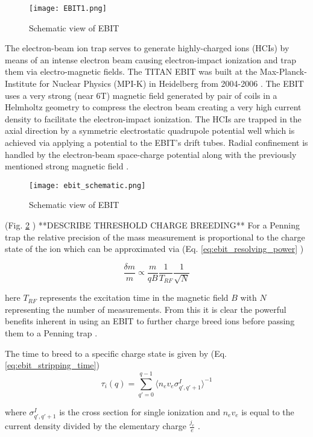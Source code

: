 \documentclass[cnatzke_thesis_proposal.tex]{subfiles}
\begin{document}
\begin{figure}[H]
  \begin{center}
    \texttt{[image: EBIT1.png]}
  \end{center}
  \caption{Schematic view of EBIT}
  \label{fig:EBIT_CUTOUT}
\end{figure}

The electron-beam ion trap serves to generate highly-charged ions (HCIs) by means of an intense electron beam causing electron-impact ionization and trap them via electro-magnetic fields.  The TITAN EBIT was built at the Max-Planck-Institute for Nuclear Physics (MPI-K) in Heidelberg from 2004-2006 \cite{TITAN_EBIT_2010}.  The EBIT uses a very strong (near 6T) magnetic field generated by pair of coils in a Helmholtz geometry to compress the electron beam creating a very high current density to facilitate the electron-impact ionization.  The HCIs are trapped in the axial direction by a symmetric electrostatic quadrupole potential well which is achieved via applying a potential to the EBIT's drift tubes.  Radial confinement is handled by the electron-beam space-charge potential along with the previously mentioned strong magnetic field \cite{TITAN_EBIT_2010}.

\begin{figure}[H]
  \begin{center}
    \texttt{[image: ebit\_schematic.png]}
  \end{center}
  \caption{Schematic view of EBIT \cite{PALFFY_THESIS}}
  \label{fig:schematic_ebit}
\end{figure}

(Fig. \ref{fig:schematic_ebit} )
**DESCRIBE  THRESHOLD CHARGE BREEDING**
For a Penning trap the relative precision of the mass measurement is proportional to the charge state of the ion which can be approximated via (Eq. \ref{eq:ebit_resolving_power} \cite{TITAN_EBIT_2010})


\begin{equation}
  \frac{\delta m}{m} \propto \frac{m}{qB} \frac{1}{T_{RF}} \frac{1}{\sqrt{N}}
  \label{eq:ebit_resolving_power}
\end{equation}

here $T_{RF}$ represents the excitation time in the magnetic field $B$ with $N$ representing the number of measurements.  From this it is clear the powerful benefits inherent in using an EBIT to further charge breed ions before passing them to a Penning trap \cite{TITAN_EBIT_2010}.

The time to breed to a specific charge state is given by (Eq. \ref{eq:ebit_stripping_time})
\begin{equation}
  \tau_{i}(q) = \sum_{q'=0}^{q-1}\langle n_e v_e \sigma^{I}_{q', q'+1} \rangle^{-1}
  \label{eq:ebit_stripping_time}
\end{equation}

where $\sigma^{I}_{q', q'+1}$ is the cross section for single ionization and $n_e v_e$ is equal to the current density divided by the elementary charge $\frac{j_e}{e}$ \cite{SPRINGER_1997}.
\end{document}
